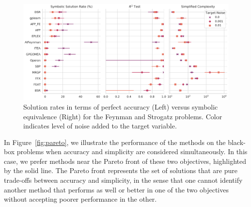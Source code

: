 \begin{figure}
    \centering
    \includegraphics[width=\textwidth]{figs/results_sym_data/pairgrid_symbolic_solution_rate_(pct)_r2_test_simplified_complexity.pdf}
    \caption{
        Solution rates in terms of perfect accuracy (Left) versus symbolic equivalence (Right) for the Feynman and Strogatz problems. 
        Color indicates level of noise added to the target variable. 
    }
    \label{fig:symbolic_solns}
\end{figure}

In Figure~\ref{fig:pareto}, we illustrate the performance of the methods on the black-box problems when accuracy and simplicity are considered simultaneously.
In this case, we prefer methods near the Pareto front of these two objectives, highlighted by the solid line. 
The Pareto front represents the set of solutions that are pure trade-offs between accuracy and simplicity, in the sense that one cannot identify another method that performs as well or better in one of the two objectives without accepting poorer performance in the other.  

